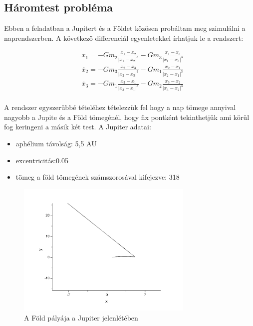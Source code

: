 \documentclass[paper=a4, fontsize=11pt]{article}
\begin{document}
\subsection{Háromtest probléma}
Ebben a feladatban a Jupitert és a Földet közösen probáltam meg szimulálni a naprendszerben.
\newline
A következő differenciál egyenletekkel írhatjuk le a rendszert:

\begin{align}
&\ddot{x_1}=-Gm_2\frac{x_1-x_2}{|x_1-x_2|^3}-Gm_3\frac{x_1-x_3}{|x_1-x_3|^3}\\
&\ddot{x_2}=-Gm_3\frac{x_2-x_3}{|x_2-x_3|^3}-Gm_1\frac{x_2-x_1}{|x_2-x_1|^3}\\
&\ddot{x_3}=-Gm_1\frac{x_3-x_1}{|x_3-x_1|^3}-Gm_2\frac{x_3-x_2}{|x_3-x_2|^3}\\
\end{align}

A rendszer egyszerübbé tételéhez tételezzük fel hogy a nap tömege annyival nagyobb a Jupite és a Föld tömegénél, hogy fix pontként tekinthetjük ami körül fog keringeni a másik két test. 
\newline
A Jupiter adatai:
\begin{itemize}
  \item aphélium távolság: 5,5 AU
  \item excentricitás:0.05
  \item tömeg a föld tömegének számszorosával kifejezve: 318
\end{itemize}

\begin{figure}[H]
  \includegraphics[width=0.75\textwidth]{3}
\caption{A Föld pályája a Jupiter jelenlétében}
\end{figure}
\end{document}
